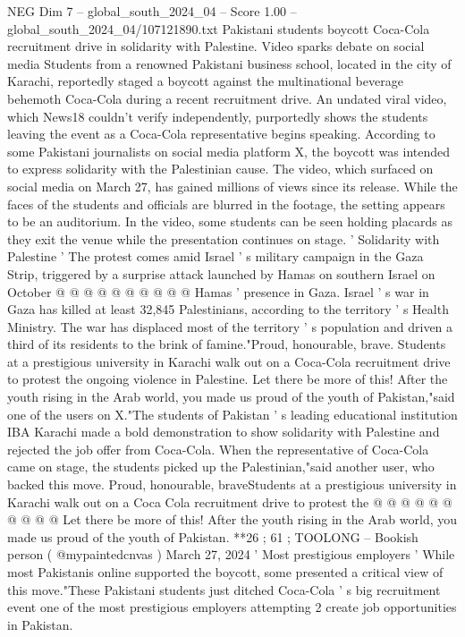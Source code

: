 \begin{textsample}{NEG Dim 7 – global\_south\_2024\_04 – Score 1.00 – global\_south\_2024\_04/107121890.txt}  \label{ex:f7_neg_280}
Pakistani students boycott Coca-Cola recruitment drive in solidarity with Palestine.
Video sparks debate on social media Students from a renowned Pakistani business school, located in the city of Karachi, reportedly staged a boycott against the multinational beverage behemoth Coca-Cola during a recent recruitment drive.
An undated viral video, which News18 couldn't verify independently, purportedly shows the students leaving the event as a Coca-Cola representative begins speaking.
According to some Pakistani journalists on social media platform X, the boycott was intended to express solidarity with the Palestinian cause.
The video, which surfaced on social media on March 27, has gained millions of views since its release.
While the faces of the students and officials are blurred in the footage, the setting appears to be an auditorium.
In the video, some students can be seen holding placards as they exit the venue while the presentation continues on stage. ' Solidarity with Palestine ' The protest comes amid Israel ' s military campaign in the Gaza Strip, triggered by a surprise attack launched by Hamas on southern Israel on October @ @ @ @ @ @ @ @ @ @ Hamas ' presence in Gaza.
Israel ' s war in Gaza has killed at least 32,845 Palestinians, according to the territory ' s Health Ministry.
The war has displaced most of the territory ' s population and driven a third of its residents to the brink of famine."Proud, honourable, brave.
Students at a prestigious university in Karachi walk out on a Coca-Cola recruitment drive to protest the ongoing violence in Palestine.
Let there be more of this!
After the youth rising in the Arab world, you made us proud of the youth of Pakistan,"said one of the users on X."The students of Pakistan ' s leading educational institution IBA Karachi made a bold demonstration to show solidarity with Palestine and rejected the job offer from Coca-Cola.
When the representative of Coca-Cola came on stage, the students picked up the Palestinian,"said another user, who backed this move.
Proud, honourable, braveStudents at a prestigious university in Karachi walk out on a Coca Cola recruitment drive to protest the @ @ @ @ @ @ @ @ @ @ Let there be more of this!
After the youth rising in the Arab world, you made us proud of the youth of Pakistan. **26 ; 61 ; TOOLONG -- Bookish person ( @mypaintedcnvas ) March 27, 2024 ' Most prestigious employers ' While most Pakistanis online supported the boycott, some presented a critical view of this move."These Pakistani students just ditched Coca-Cola ' s big recruitment event one of the most prestigious employers attempting 2 create job opportunities in Pakistan.

\end{textsample}
